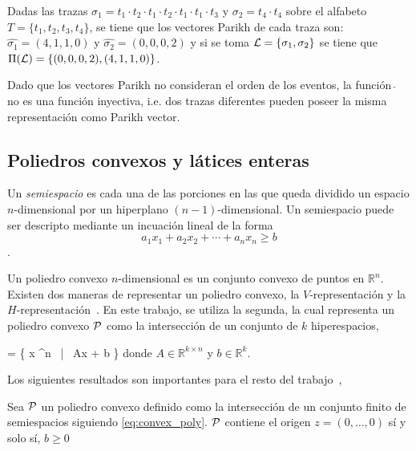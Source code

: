 \begin{example}
    Dadas las trazas  $\sigma_1=t_1 \cdot t_2 \cdot t_1 \cdot t_2 \cdot t_1 \cdot t_1 \cdot t_3$
    y $\sigma_2=t_4 \cdot t_4$ sobre el alfabeto $T=\{t_1,t_2,t_3,t_4\}$,
    se tiene que los vectores Parikh de cada traza son: $\widehat{\sigma_1} = (4,1,1,0)$ y
    $\widehat{\sigma_2} = (0,0,0,2)$ y si se toma \mbox{${\mathcal L} =\{\sigma_1,\sigma_2\}$}
    se tiene que $\Pi({\mathcal L})=\{ (0,0,0,2),(4,1,1,0) \}$.
\end{example}

Dado que los vectores Parikh no consideran el orden de los eventos, la función \mbox{$\widehat{\ }$} no 
es una función inyectiva, i.e. dos trazas diferentes pueden poseer la misma representación como Parikh
vector.

\subsection{Poliedros convexos y látices enteras} 
\label{sec:2.discovery polyhedra}

Un \textit{semiespacio} es cada
una de las porciones en las que queda dividido un espacio $n$-dimensional por un hiperplano $(n-1)$-dimensional. Un semiespacio
puede ser descripto mediante un incuación lineal de la forma $$a_1x_1 + a_2x_2 + \cdots + a_nx_n \geq b$$.

Un poliedro convexo $n$-dimensional es un conjunto convexo de puntos en $\mathbb{R}^n$. Existen 
dos maneras de representar un poliedro convexo, la $V$-representación y la $H$-representación~\cite{Rockafellar70}.
En este trabajo, se utiliza la segunda, la cual representa un poliedro convexo ${\mathcal P}$ 
como la intersección de un conjunto de $k$ hiperespacios,

    \ph = \{ x \in {}^n ~|~ A\cdot x + b \}
\eequation
donde  \mbox{$A \in \mathbb{R}^{k \times n}$} y
\mbox{$b\in\mathbb{R}^{k}$}.

Los siguientes resultados son importantes para el resto del trabajo~\cite{CarmonaC14},

\begin{theorem}
\label{theo:orig_in_b_pos}
    Sea ${\mathcal P}$ un poliedro convexo definido como la intersección de un conjunto
    finito de semiespacios siguiendo \eqref{eq:convex_poly}. ${\mathcal P}$ contiene el 
    origen \mbox{$z=(0,\ldots,0)$} sí y solo sí, $b \geq 0$
\end{theorem}


